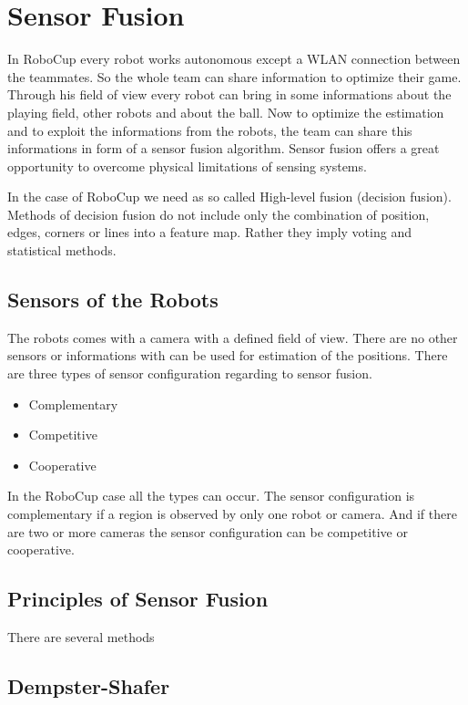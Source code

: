 
\chapter{Sensor Fusion}
In RoboCup every robot works autonomous except a WLAN connection between the teammates. So the whole team can share information to optimize their game.
Through his field of view every robot can bring in some informations about the playing field, other robots and about the ball. Now to optimize the estimation and to exploit the informations from the robots, the team can share this informations in form of a sensor fusion algorithm.
Sensor fusion offers a great opportunity to overcome physical limitations of sensing systems.\cite{IntroSF} 

In the case of RoboCup we need as so called High-level fusion (decision fusion). Methods of decision fusion do not include only the combination of position, edges, corners or lines into a feature map. Rather they imply voting and statistical methods. \cite{IntroSF}

\section{Sensors of the Robots}
The robots comes with a camera with a defined field of view. There are no other sensors or informations with can be used for estimation of the positions. 
There are three types of sensor configuration regarding to sensor fusion. \cite{IntroSF}
\begin{itemize}
	\item Complementary
	\item Competitive
	\item Cooperative
\end{itemize}
In the RoboCup case all the types can occur. The sensor configuration is complementary if a region is  observed by only one robot or camera. And if there are two or more cameras the sensor configuration can be competitive or cooperative.

\section{Principles of Sensor Fusion}
There are several methods 


\section{Dempster-Shafer}

